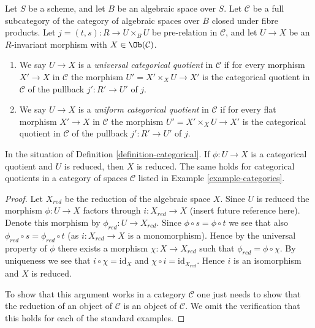 \begin{definition}
\label{definition-universal-categorical}
Let $S$ be a scheme, and let $B$ be an algebraic space over $S$.
Let $\mathcal{C}$ be a full subcategory of the category of algebraic
spaces over $B$ closed under fibre products.
Let $j = (t, s) : R \to U \times_B U$ be pre-relation in
$\mathcal{C}$, and let $U \to X$ be an $R$-invariant morphism with
$X \in \Ob(\mathcal{C})$.
\begin{enumerate}
\item We say $U \to X$ is a {\it universal categorical quotient}
in $\mathcal{C}$ if for every morphism $X' \to X$ in $\mathcal{C}$
the morphism $U' = X' \times_X U \to X'$ is the categorical quotient in
$\mathcal{C}$ of the pullback $j' : R' \to U'$ of $j$.
\item We say $U \to X$ is a {\it uniform categorical quotient}
in $\mathcal{C}$ if for every flat morphism $X' \to X$ in $\mathcal{C}$
the morphism $U' = X' \times_X U \to X'$ is the categorical quotient in
$\mathcal{C}$ of the pullback $j' : R' \to U'$ of $j$.
\end{enumerate}
\end{definition}

\begin{lemma}
\label{lemma-categorical-reduced}
In the situation of
Definition \ref{definition-categorical}.
If $\phi : U \to X$ is a categorical quotient and $U$ is reduced,
then $X$ is reduced. The same holds for categorical quotients in
a category of spaces $\mathcal{C}$ listed in
Example \ref{example-categories}.
\end{lemma}

\begin{proof}
Let $X_{red}$ be the reduction of the algebraic space $X$.
Since $U$ is reduced the morphism $\phi : U \to X$ factors through
$i : X_{red} \to X$ (insert future reference here). Denote this morphism
by $\phi_{red} : U \to X_{red}$. Since $\phi \circ s = \phi \circ t$ we
see that also $\phi_{red} \circ s = \phi_{red} \circ t$ (as
$i : X_{red} \to X$ is a monomorphism). Hence by the universal property
of $\phi$ there exists a morphism $\chi : X \to X_{red}$ such that
$\phi_{red} = \phi \circ \chi$. By uniqueness we see that
$i \circ \chi = \text{id}_X$ and $\chi \circ i = \text{id}_{X_{red}}$.
Hence $i$ is an isomorphism and $X$ is reduced.

\medskip\noindent
To show that this argument works in a category $\mathcal{C}$ one
just needs to show that the reduction of an object of $\mathcal{C}$
is an object of $\mathcal{C}$. We omit the verification that this
holds for each of the standard examples.
\end{proof}





